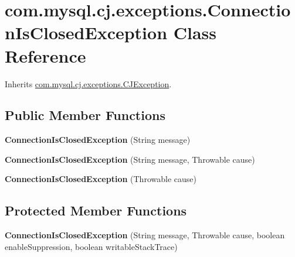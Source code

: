 \hypertarget{classcom_1_1mysql_1_1cj_1_1exceptions_1_1_connection_is_closed_exception}{}\section{com.\+mysql.\+cj.\+exceptions.\+Connection\+Is\+Closed\+Exception Class Reference}
\label{classcom_1_1mysql_1_1cj_1_1exceptions_1_1_connection_is_closed_exception}


Inherits \mbox{\hyperlink{classcom_1_1mysql_1_1cj_1_1exceptions_1_1_c_j_exception}{com.\+mysql.\+cj.\+exceptions.\+C\+J\+Exception}}.

\subsection*{Public Member Functions}
\begin{DoxyCompactItemize}
\item 
\mbox{\label{classcom_1_1mysql_1_1cj_1_1exceptions_1_1_connection_is_closed_exception_a1090e3bca62a1f7b588c1a36f811686f}} 
{\bfseries Connection\+Is\+Closed\+Exception} (String message)
\item 
\mbox{\label{classcom_1_1mysql_1_1cj_1_1exceptions_1_1_connection_is_closed_exception_a35314af9b05207fb9ee585c3eb300086}} 
{\bfseries Connection\+Is\+Closed\+Exception} (String message, Throwable cause)
\item 
\mbox{\label{classcom_1_1mysql_1_1cj_1_1exceptions_1_1_connection_is_closed_exception_a28917930dc54fa25234fdaff0340bb5b}} 
{\bfseries Connection\+Is\+Closed\+Exception} (Throwable cause)
\end{DoxyCompactItemize}
\subsection*{Protected Member Functions}
\begin{DoxyCompactItemize}
\item 
\mbox{\label{classcom_1_1mysql_1_1cj_1_1exceptions_1_1_connection_is_closed_exception_a02e0a106b5dacc40096467a3ce9d1273}} 
{\bfseries Connection\+Is\+Closed\+Exception} (String message, Throwable cause, boolean enable\+Suppression, boolean writable\+Stack\+Trace)
\end{DoxyCompactItemize}
